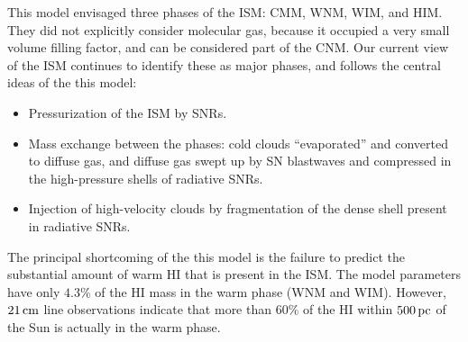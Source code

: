 \documentclass[a4paper,10pt]{article}
\begin{document}
{\noindent}This model envisaged three phases of the ISM: CMM, WNM, WIM, and HIM. They did not explicitly consider molecular gas, because it occupied a very small volume filling factor, and can be considered part of the CNM. Our current view of the ISM continues to identify these as major phases, and follows the central ideas of the this model:

\begin{itemize}
    \item Pressurization of the ISM by SNRs.
    \item Mass exchange between the phases: cold clouds ``evaporated'' and converted to diffuse gas, and diffuse gas swept up by SN blastwaves and compressed in the high-pressure shells of radiative SNRs.
    \item Injection of high-velocity clouds by fragmentation of the dense shell present in radiative SNRs.
\end{itemize}

{\noindent}The principal shortcoming of the this model is the failure to predict the substantial amount of warm HI that is present in the ISM. The model parameters have only $4.3\%$ of the HI mass in the warm phase (WNM and WIM). However, $21\,{\rm cm}$ line observations indicate that more than $60\%$ of the HI within $500\,{\rm pc}$ of the Sun is actually in the warm phase.
\end{document}
